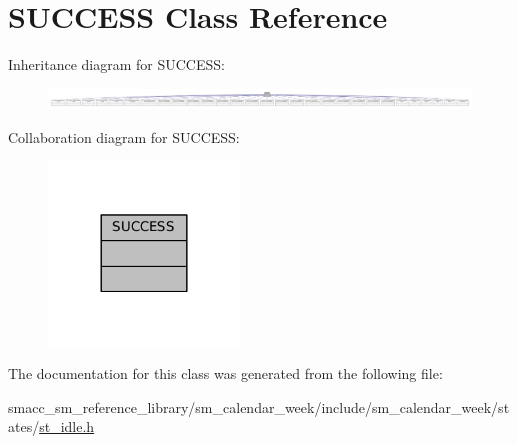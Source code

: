 \hypertarget{classSUCCESS}{}\section{S\+U\+C\+C\+E\+SS Class Reference}
\label{classSUCCESS}


Inheritance diagram for S\+U\+C\+C\+E\+SS\+:
\nopagebreak
\begin{figure}[H]
\begin{center}
\leavevmode
\includegraphics[width=350pt]{classSUCCESS__inherit__graph}
\end{center}
\end{figure}


Collaboration diagram for S\+U\+C\+C\+E\+SS\+:
\nopagebreak
\begin{figure}[H]
\begin{center}
\leavevmode
\includegraphics[width=144pt]{classSUCCESS__coll__graph}
\end{center}
\end{figure}


The documentation for this class was generated from the following file\+:\begin{DoxyCompactItemize}
\item 
smacc\+\_\+sm\+\_\+reference\+\_\+library/sm\+\_\+calendar\+\_\+week/include/sm\+\_\+calendar\+\_\+week/states/\hyperlink{sm__calendar__week_2include_2sm__calendar__week_2states_2st__idle_8h}{st\+\_\+idle.\+h}\end{DoxyCompactItemize}
